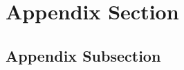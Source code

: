 \documentclass[11pt,conference]{IEEEtran}
\begin{document}
%
%
\appendix

\section{Appendix Section}

\subsection{Appendix Subsection}





\end{document}
